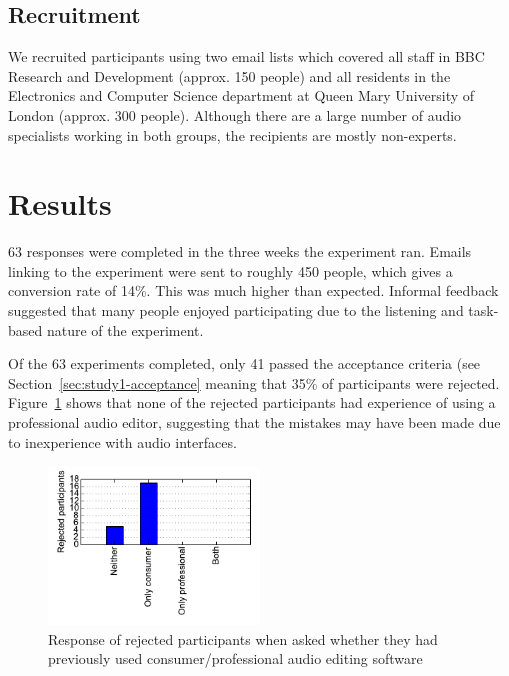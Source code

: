 \subsection{Recruitment}\label{sec:colourised-recruitment}
We recruited participants using two email lists which covered all staff in BBC Research and Development (approx. 150
people) and all residents in the Electronics and Computer Science department at Queen Mary University of London
(approx. 300 people). Although there are a large number of audio specialists working in both groups, the recipients are
mostly non-experts.



\section{Results}
63 responses were completed in the three weeks the experiment ran. Emails linking to the experiment were sent to
roughly 450 people, which gives a conversion rate of 14\%. This was much higher than expected. Informal feedback
suggested that many people enjoyed participating due to the listening and task-based nature of the experiment. 

Of the 63 experiments completed, only 41 passed the acceptance criteria (see Section~\ref{sec:study1-acceptance}
meaning that 35\% of participants were rejected. Figure~\ref{fig:rejectdaw} shows that none of the rejected
participants had experience of using a professional audio editor, suggesting that the mistakes may have been made due
to inexperience with audio interfaces.

\begin{figure}[ht]
  \centering
  \includegraphics[width=0.5\textwidth]{figs/reject-daw.pdf}
  \caption{Response of rejected participants when asked whether they had previously used consumer/professional audio
    editing software}
  \label{fig:rejectdaw}
\end{figure}

